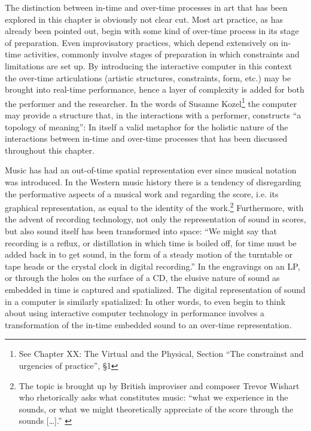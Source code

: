 The distinction between in-time and over-time processes in art that has been explored in this chapter is obviously not clear cut. Most art practice, as has already been pointed out, begin with some kind of over-time process in its stage of preparation. Even improvisatory practices, which depend extensively on in-time activities, commonly involve stages of preparation in which constraints and  limitations are set up. By introducing the interactive computer in this context the over-time articulations (artistic structures, constraints, form, etc.) may be brought into real-time performance, hence a layer of complexity is added for both the performer and the researcher. In the words of Susanne Kozel\footnote{See Chapter XX: The Virtual and the Physical, Section ``The constrainst and urgencies of practice'', \S1} the computer may provide a structure that, in the interactions with a performer, constructs ``a topology of meaning'': In itself a valid metaphor for the holistic nature of the interactions between in-time and over-time processes that has been discussed throughout this chapter.

Music has had an out-of-time spatial representation ever since musical notation was introduced. In the Western music history there is a tendency of disregarding the performative aspects of a musical work and regarding the score, i.e. its graphical representation, as equal to the identity of the work.\footnote{The topic is brought up by British improviser and composer Trevor Wishart who rhetorically asks what constitutes music: ``what we experience in the sounds, or what we might theoretically appreciate of the score through the sounds [\ldots].'' \cite{wis96}} Furthermore, with the advent of recording technology, not only the representation of sound in scores, but also sound itself has been transformed into space: ``We might say that recording is a reflux, or distillation in which time is boiled off, for time must be added back in to get sound, in the form of a steady motion of the turntable or tape heads or the crystal clock in digital recording.'' \parencite[54]{evens05} In the engravings on an LP, or through the holes on the surface of a CD, the elusive nature of sound as embedded in time is captured and spatialized. The digital representation of sound in a computer is similarly spatialized: In other words, to even begin to think about using interactive computer technology in performance involves a transformation of the in-time embedded sound to an over-time representation.

